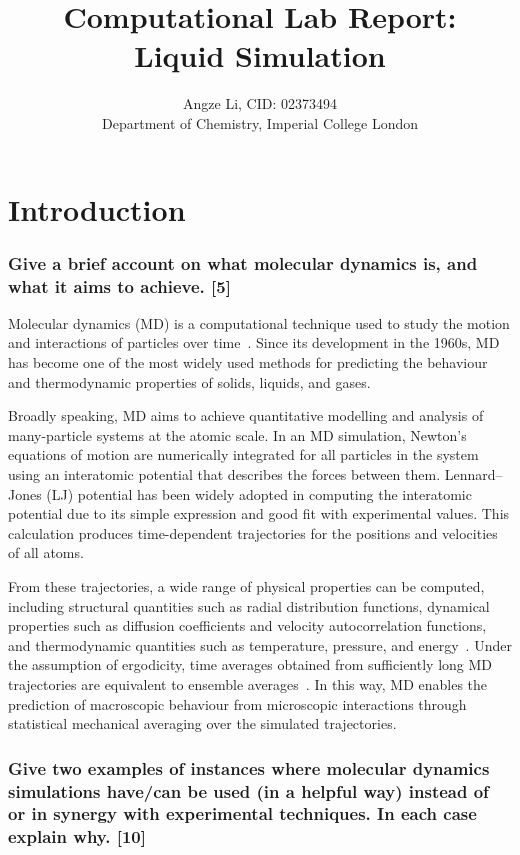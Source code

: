 \documentclass[a4paper,10pt,twocolumn]{article}
\title{\textbf{Computational Lab Report: \\
Liquid Simulation}}
\author{Angze Li, CID: 02373494 \\
    Department of Chemistry, Imperial College London}
\begin{document}
\maketitle

\section{Introduction}  %

\subsubsection*{Give a brief account on what molecular dynamics is, and what it aims to achieve. [5]}

Molecular dynamics (MD) is a computational technique used to study the motion and interactions of particles over time~\cite{leimkuhler2015molecular}. Since its development in the 1960s, MD has become one of the most widely used methods for predicting the behaviour and thermodynamic properties of solids, liquids, and gases. 

Broadly speaking, MD aims to achieve quantitative modelling and analysis of many-particle systems at the atomic scale. In an MD simulation, Newton’s equations of motion are numerically integrated for all particles in the system using an interatomic potential that describes the forces between them. Lennard--Jones (LJ) potential has been widely adopted in computing the interatomic potential due to its simple expression and good fit with experimental values. This calculation produces time-dependent trajectories for the positions and velocities of all atoms.

From these trajectories, a wide range of physical properties can be computed, including structural quantities such as radial distribution functions, dynamical properties such as diffusion coefficients and velocity autocorrelation functions, and thermodynamic quantities such as temperature, pressure, and energy~\cite{van1990computer}. Under the assumption of ergodicity, time averages obtained from sufficiently long MD trajectories are equivalent to ensemble averages~\cite{cho1992ergodicity}. In this way, MD enables the prediction of macroscopic behaviour from microscopic interactions through statistical mechanical averaging over the simulated trajectories.


\subsubsection*{Give two examples of instances where molecular dynamics simulations have/can be used (in a helpful way) instead of or in synergy with experimental techniques. In each case explain why. [10]}
\end{document}
